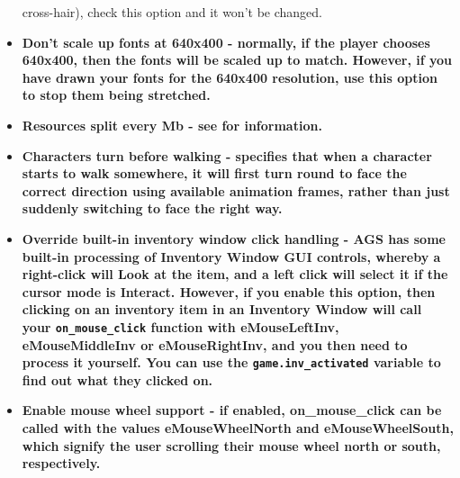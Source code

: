 \begin{itemize}
cross-hair), check this option and it won't be changed.
\item \bf{Don't scale up fonts at 640x400} - normally, if the player chooses 640x400, then
the fonts will be scaled up to match. However, if you have drawn your fonts
for the 640x400 resolution, use this option to stop them being stretched.
\item \bf{Resources split every Mb} - see  for information.
\item \bf{Characters turn before walking} - specifies that when a character starts
to walk somewhere, it will first turn round to face the correct direction
using available animation frames, rather than just suddenly switching to
face the right way.
\item \bf{Override built-in inventory window click handling} - AGS has some built-in processing
of Inventory Window GUI controls, whereby a right-click will Look at the item, and a left click
will select it if the cursor mode is Interact. However, if you enable this
option, then clicking on an inventory item in an Inventory Window will call your \verb$on_mouse_click$
function  with eMouseLeftInv, eMouseMiddleInv or eMouseRightInv, and you then need to process it
yourself. You can use the \verb$game.inv_activated$ variable to find out what they clicked on.
\item \bf{Enable mouse wheel support} - if enabled, on_mouse_click can be called with
the values eMouseWheelNorth and eMouseWheelSouth, which signify the user scrolling their mouse
wheel north or south, respectively.


\end{itemize}
